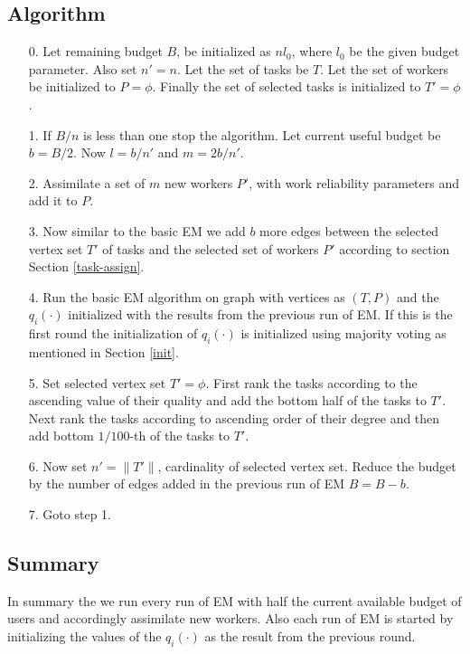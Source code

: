 \documentclass[10pt]{article}
\begin{document}
\subsection{Algorithm}
\begin{itemize}
\item[0.]
Let remaining budget $B$, be initialized as $nl_0$, where $l_0$ be the given budget parameter. Also set $n'=n$. Let the set of tasks be $T$. Let the set of workers be initialized to $P = \phi$. Finally the set of selected tasks is initialized to $T'=\phi$.
\item[1.]
If $B/n$ is less than one stop the algorithm. Let current useful budget be $b = B/2$. Now $l = b/n'$ and $m = 2b/n'$.
\item[2.]
Assimilate a set of $m$ new workers $P'$, with work reliability parameters and add it to $P$.
\item[3.]
Now similar to the basic EM we add $b$ more edges between the selected vertex set $T'$ of tasks and the selected set of workers $P'$ according to section Section \ref{task-assign}.
\item[4.]
Run the basic EM algorithm on graph with vertices as $(T, P)$ and the $q_i(\cdot)$ initialized with the results from the previous run of EM. If this is the first round the initialization of $q_i(\cdot)$ is initialized using majority voting as mentioned in Section \ref{init}.
\item[5.]
Set selected vertex set $T'=\phi$. First rank the tasks according to the ascending value of their quality and add the bottom half of the tasks to $T'$. Next rank the tasks according to ascending order of their degree and then add bottom $1/100$-th of the tasks to $T'$.
\item[6.]
Now set $n' = \|T'\|$, cardinality of selected vertex set. Reduce the budget by the number of edges added in the previous run of EM $B = B - b$.
\item[7.]
Goto step 1.
\end{itemize}



\subsection{Summary}

In summary the we run every run of EM with half the current available budget of users and accordingly assimilate new workers. Also each run of EM is started by initializing the values of the $q_i(\cdot)$ as the result from the previous round.
\end{document}

